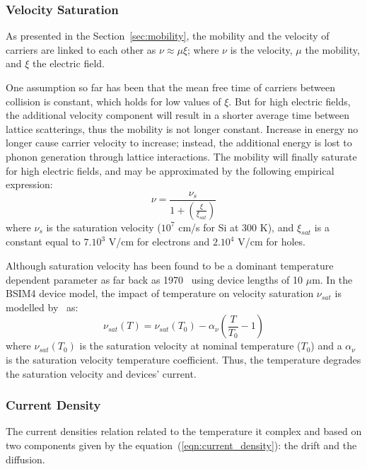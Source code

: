 \subsubsection{Velocity Saturation}    %
As presented in the Section~\ref{sec:mobility}, the mobility and the velocity of carriers are linked to each other as \(\nu \approx \mu \xi \); where \(\nu \) is the velocity, \(\mu \) the mobility, and \(\xi \) the electric field.

One assumption so far has been that the mean free time of carriers between collision is constant, which holds for low values of \(\xi \). But for high electric fields, the additional velocity component will result in a shorter average time between lattice scatterings, thus the mobility is not longer constant. Increase in energy no longer cause carrier velocity to increase; instead, the additional energy is lost to phonon generation through lattice interactions. The mobility will finally saturate for high electric fields, and may be approximated by the following empirical expression: 
\begin{equation}
\label{eqn:vsat}
    \nu = \frac{\nu_s}{1 + \left(\frac{\xi}{\xi_{sat}}\right)}
\end{equation}
where \(\nu_s \) is the saturation velocity (\(10^7 \) cm/s for Si at 300 K), and \(\xi_{sat}\) is a constant equal to \(7.10^3 \) V/cm for electrons and \(2.10^4 \) V/cm for holes.

Although saturation velocity has been found to be a dominant temperature dependent parameter as far back as 1970~\cite{Fowler1970} using device lengths of 10 \(\mu \)m. In the BSIM4 device model, the impact of temperature on velocity saturation \(\nu_{sat} \) is modelled by~\cite{Cheng1997} as:
\begin{equation}
\label{eqn:vsat_T}
    \nu_{sat}(T) = \nu_{sat}(T_0) - \alpha_\nu \left(\frac{T}{T_0}-1\right)
\end{equation}
where \(\nu_{sat}(T_0)\) is the saturation velocity at nominal temperature (\(T_0 \)) and a \(\alpha_\nu \) is the saturation velocity temperature coefficient. Thus, the temperature degrades the saturation velocity and devices' current.

\subsubsection{Current Density}        %
\label{sec:current_density}
The current densities relation related to the temperature it complex and based on two components given by the equation~(\ref{eqn:current_density}): the drift and the diffusion. 

